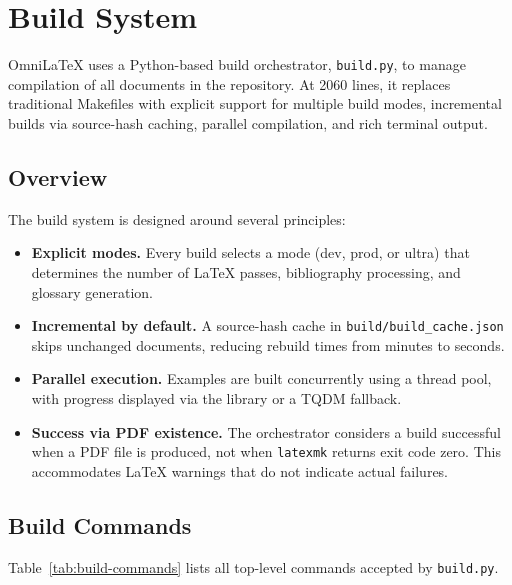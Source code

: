 \chapter{Build System}
\label{ch:build-system}

OmniLaTeX uses a Python-based build orchestrator, \texttt{build.py}, to manage
compilation of all documents in the repository.  At 2060 lines, it replaces
traditional Makefiles with explicit support for multiple build modes,
incremental builds via source-hash caching, parallel compilation, and rich
terminal output.

\section{Overview}

The build system is designed around several principles:

\begin{itemize}
    \item \textbf{Explicit modes.}  Every build selects a mode
          (\textsf{dev}, \textsf{prod}, or \textsf{ultra}) that determines the
          number of \LaTeX{} passes, bibliography processing, and glossary
          generation.
    \item \textbf{Incremental by default.}  A source-hash cache in
          \texttt{build/build\_cache.json} skips unchanged documents, reducing
          rebuild times from minutes to seconds.
    \item \textbf{Parallel execution.}  Examples are built concurrently using a
          thread pool, with progress displayed via the 
          library or a TQDM fallback.
    \item \textbf{Success via PDF existence.}  The orchestrator considers a
          build successful when a PDF file is produced, not when
          \texttt{latexmk} returns exit code zero.  This accommodates
          \LaTeX{} warnings that do not indicate actual failures.
\end{itemize}

\section{Build Commands}

Table~\ref{tab:build-commands} lists all top-level commands accepted by
\texttt{build.py}.

